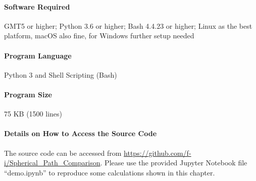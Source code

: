 \paragraph{Software Required} GMT5 or higher; Python 3.6 or higher; Bash 4.4.23
or higher; Linux as the best platform, macOS also fine, for Windows further
setup needed
\paragraph{Program Language} Python 3 and Shell Scripting (Bash)
\paragraph{Program Size} 75 KB (1500 lines)
\paragraph{Details on How to Access the Source Code} The source code can be
accessed from \url{https://github.com/f-i/Spherical_Path_Comparison}. Please use
the provided Jupyter Notebook file ``demo.ipynb'' to reproduce some calculations
shown in this chapter.
